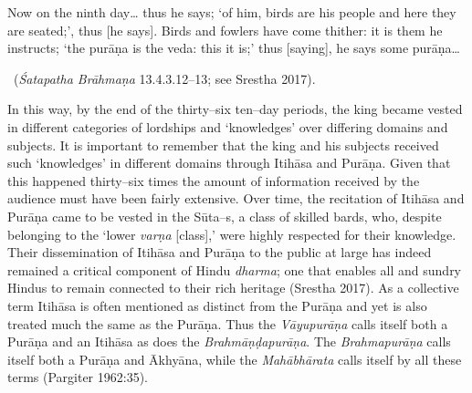 \begin{myquote}
Now on the ninth day… thus he says; ‘of him, birds are his people and here they are seated;’, thus [he says]. Birds and fowlers have come thither: it is them he instructs; ‘the purāṇa is the veda: this it is;’ thus [saying], he says some purāṇa…

~\hfill (\textit{Śatapatha Brāhmaṇa} 13.4.3.12–13; see Srestha 2017).
\end{myquote}

In this way, by the end of the thirty–six ten–day periods, the king became vested in different categories of lordships and ‘knowledges’ over differing domains and subjects. It is important to remember that the king and his subjects received such ‘knowledges’ in different domains through Itihāsa and Purāṇa. Given that this happened thirty–six times the amount of information received by the audience must have been fairly extensive. Over time, the recitation of Itihāsa and Purāṇa came to be vested in the Sūta–s, a class of skilled bards, who, despite belonging to the ‘lower \textit{varṇa} [class],’ were highly respected for their knowledge. Their dissemination of Itihāsa and Purāṇa to the public at large has indeed remained a critical component of Hindu \textit{dharma}; one that enables all and sundry Hindus to remain connected to their rich heritage (Srestha 2017). As a collective term Itihāsa is often mentioned as distinct from the Purāṇa and yet is also treated much the same as the Purāṇa. Thus the \textit{Vāyupurāṇa} calls itself both a Purāṇa and an Itihāsa as does the \textit{Brahmāṇḍapurāṇa}. The \textit{Brahmapurāṇa} calls itself both a Purāṇa and Ākhyāna, while the \textit{Mahābhārata} calls itself by all these terms (Pargiter 1962:35). 

